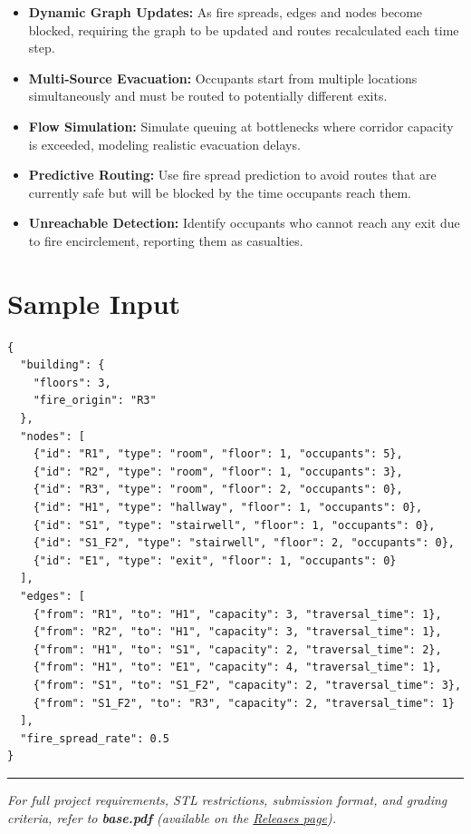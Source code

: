\begin{itemize}
  \item \textbf{Dynamic Graph Updates:} As fire spreads, edges and nodes become blocked, requiring the graph to be updated and routes recalculated each time step.
  \item \textbf{Multi-Source Evacuation:} Occupants start from multiple locations simultaneously and must be routed to potentially different exits.
  \item \textbf{Flow Simulation:} Simulate queuing at bottlenecks where corridor capacity is exceeded, modeling realistic evacuation delays.
  \item \textbf{Predictive Routing:} Use fire spread prediction to avoid routes that are currently safe but will be blocked by the time occupants reach them.
  \item \textbf{Unreachable Detection:} Identify occupants who cannot reach any exit due to fire encirclement, reporting them as casualties.
\end{itemize}

\section{Sample Input}

\begin{lstlisting}[style=json, caption={data/input\_sample.json}]
{
  "building": {
    "floors": 3,
    "fire_origin": "R3"
  },
  "nodes": [
    {"id": "R1", "type": "room", "floor": 1, "occupants": 5},
    {"id": "R2", "type": "room", "floor": 1, "occupants": 3},
    {"id": "R3", "type": "room", "floor": 2, "occupants": 0},
    {"id": "H1", "type": "hallway", "floor": 1, "occupants": 0},
    {"id": "S1", "type": "stairwell", "floor": 1, "occupants": 0},
    {"id": "S1_F2", "type": "stairwell", "floor": 2, "occupants": 0},
    {"id": "E1", "type": "exit", "floor": 1, "occupants": 0}
  ],
  "edges": [
    {"from": "R1", "to": "H1", "capacity": 3, "traversal_time": 1},
    {"from": "R2", "to": "H1", "capacity": 3, "traversal_time": 1},
    {"from": "H1", "to": "S1", "capacity": 2, "traversal_time": 2},
    {"from": "H1", "to": "E1", "capacity": 4, "traversal_time": 1},
    {"from": "S1", "to": "S1_F2", "capacity": 2, "traversal_time": 3},
    {"from": "S1_F2", "to": "R3", "capacity": 2, "traversal_time": 1}
  ],
  "fire_spread_rate": 0.5
}
\end{lstlisting}

\vfill
\noindent\rule{\textwidth}{0.4pt}
{\small\textit{For full project requirements, STL restrictions, submission format, and grading criteria, refer to \textbf{base.pdf} (available on the \href{https://github.com/BestSithInEU/cse211-term-projects/releases}{Releases page}).}}
